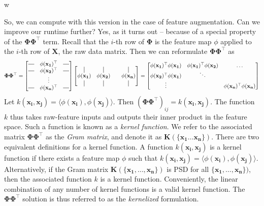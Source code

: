 w\documentclass{article}
\newcommand*{\vertbar}{\rule[-1ex]{0.5pt}{2.5ex}}
\newcommand*{\horzbar}{\rule[.5ex]{2.5ex}{0.5pt}}
\begin{document}
So, we can compute with this version in the case of feature augmentation. Can we improve our runtime further? Yes, as it turns out -- because of a special property of the $\mathbf{\Phi\Phi^{\top}}$ term. Recall that the $i$-th row of $\mathbf{\Phi}$ is the feature map $\phi$ applied to the $i$-th row of $\mathbf{X}$, the raw data matrix. Then we can reformulate $\mathbf{\Phi\Phi^{\top}}$ as $$\mathbf{\Phi\Phi^{\top}} = \begin{bmatrix} \horzbar & \phi(\mathbf{x_1})^{\top} & \horzbar  \\ \horzbar & \phi(\mathbf{x_2})^{\top} & \horzbar \\ & \vdots & \\ \horzbar & \phi(\mathbf{x_n})^{\top} & \horzbar \end{bmatrix}\begin{bmatrix} \vertbar & \vertbar & & \vertbar \\ \phi(\mathbf{x_1}) & \phi(\mathbf{x_2}) & & \phi(\mathbf{x_n}) \\ \vertbar & \vertbar & & \vertbar \end{bmatrix} = \begin{bmatrix}\phi(\mathbf{x_1})^{\top}\phi(\mathbf{x_1}) & \phi(\mathbf{x_1})^{\top}\phi(\mathbf{x_2}) & \hdots \\ \phi(\mathbf{x_2})^{\top}\phi(\mathbf{x_1}) & \ddots & \\ \vdots & & \phi(\mathbf{x_n})^{\top}\phi(\mathbf{x_n}) \end{bmatrix}$$ Let $k(\mathbf{x_i, x_j}) = \langle \phi(\mathbf{x_i}), \phi(\mathbf{x_j}) \rangle$. Then $(\mathbf{\Phi\Phi^{\top}})_{ij} = k(\mathbf{x_i, x_j})$. The function $k$ thus takes raw-feature inputs and outputs their inner product in the feature space. Such a function is known as a \textit{kernel function}. We refer to the associated matrix $\mathbf{\Phi\Phi^{\top}}$ as the \textit{Gram matrix}, and denote it as $\mathbf{K(\{\mathbf{x_1} \hdots \mathbf{x_n}\})}$. There are two equivalent definitions for a kernel function. A function $k(\mathbf{x_i, x_j})$ is a kernel function if there exists a feature map $\phi$ such that $k(\mathbf{x_i, x_j}) = \langle \phi(\mathbf{x_i}), \phi(\mathbf{x_j})\rangle$. Alternatively, if the Gram matrix $\mathbf{K(\{\mathbf{x_1, \hdots, x_n}\})}$ is PSD for all $\{\mathbf{x_1, \hdots, x_n}\})$, then the associated function $k$ is a kernel function. Conveniently, the linear combination of any number of kernel functions is a valid kernel function. The $\mathbf{\Phi\Phi^{\top}}$ solution is thus referred to as the \textit{kernelized} formulation. \\\\\ 
\end{document}
